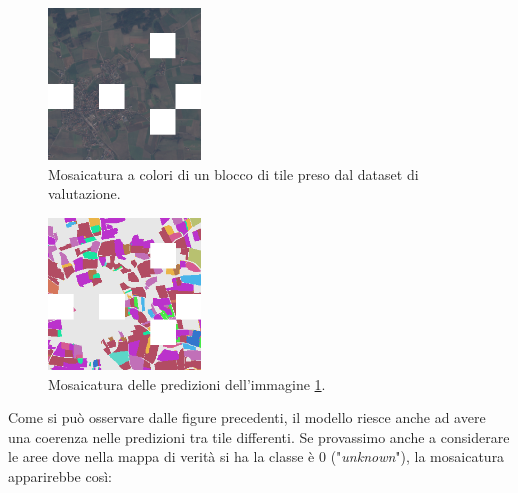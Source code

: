 \begin{multicols}{2}
{
    \begin{figure}[H]
        \centering
        \includegraphics[width=0.36\textwidth]{Immagini/sperimentazione/MOSAICATURA_3_RGB.png}
        \caption{Mosaicatura a colori di un blocco di tile preso dal dataset di valutazione.}
        \label{fig:MOSAIC_RGB_3}
    \end{figure}
}
{
    \begin{figure}[H]
        \centering
        \includegraphics[width=0.36\textwidth]{Immagini/sperimentazione/MOSAICATURA_3_MASK.png}
        \caption{Mosaicatura delle predizioni dell'immagine \ref{fig:MOSAIC_RGB_3}.}
    \end{figure}
}
\end{multicols}
Come si può osservare dalle figure precedenti, il modello riesce anche ad avere una coerenza 
nelle predizioni tra tile differenti.
Se provassimo anche a considerare le aree dove nella mappa di verità si ha la classe è 0 
("\textit{unknown}"), la mosaicatura apparirebbe così:

